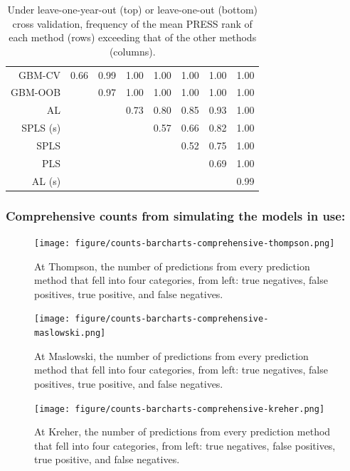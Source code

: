 \documentclass[authoryear,review, 12pt]{elsarticle}
\begin{document}
\begin{table}[h!]
{\begin{tabular}{rccccccc}
  \hline
GBM-CV & 0.66 & 0.99 & 1.00 & 1.00 & 1.00 & 1.00 & 1.00 \\ 
  GBM-OOB &  & 0.97 & 1.00 & 1.00 & 1.00 & 1.00 & 1.00 \\ 
  AL &  &  & 0.73 & 0.80 & 0.85 & 0.93 & 1.00 \\ 
  SPLS (s) &  &  &  & 0.57 & 0.66 & 0.82 & 1.00 \\ 
  SPLS &  &  &  &  & 0.52 & 0.75 & 1.00 \\ 
  PLS &  &  &  &  &  & 0.69 & 1.00 \\ 
  AL (s) &  &  &  &  &  &  & 0.99 \\ 
  
    \end{tabular}}
    \caption{Under leave-one-year-out (top) or leave-one-out (bottom) cross validation, frequency of the mean PRESS rank of each method (rows) exceeding that of the other methods (columns).}
    \label{table:press.pairs.annual-comprehensive}
\end{table}

\subsubsection{Comprehensive counts from simulating the models in
use:}\label{comprehensive-counts-from-simulating-the-models-in-use}

\begin{figure}[htbp]
\centering
\texttt{[image: figure/counts-barcharts-comprehensive-thompson.png]}
\caption{At Thompson, the number of predictions from every prediction
method that fell into four categories, from left: true negatives, false
positives, true positive, and false negatives.}
\end{figure}

\begin{figure}[htbp]
\centering
\texttt{[image: figure/counts-barcharts-comprehensive-maslowski.png]}
\caption{At Maslowski, the number of predictions from every prediction
method that fell into four categories, from left: true negatives, false
positives, true positive, and false negatives.}
\end{figure}

\begin{figure}[htbp]
\centering
\texttt{[image: figure/counts-barcharts-comprehensive-kreher.png]}
\caption{At Kreher, the number of predictions from every prediction
method that fell into four categories, from left: true negatives, false
positives, true positive, and false negatives.}
\end{figure}
\end{document}
